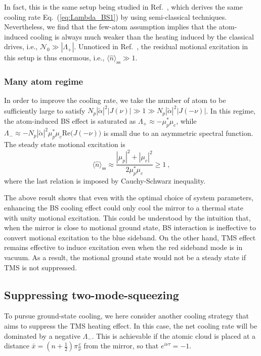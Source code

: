 \documentclass[aps, pra, reprint, amsmath, amssymb, groupedaddress, acknowledgments]{revtex4-1}
\begin{document}
In fact, this is the same setup being studied in Ref.~\cite{2016PhRvA..93b3816S}, which derives the same cooling rate Eq.~(\ref{eq:Lambda_BS1}) by using semi-classical techniques.  Nevertheless, we find that the few-atom assumption implies that the atom-induced cooling is always much weaker than the heating induced by the classical drives, i.e., $\mathcal{N}_0 \gg |\Lambda_+|$.  Unnoticed in Ref.~\cite{2016PhRvA..93b3816S}, the residual motional excitation in this setup is thus enormous, i.e., $\langle \hat{n} \rangle_\textrm{ss} \gg 1$.

\subsubsection{Many atom regime}

In order to improve the cooling rate, we take the number of atom to be sufficiently large to satisfy $N_p |\tilde{\alpha}|^2 |J(\nu)| \gg 1 \gg N_p |\tilde{\alpha}|^2 |J(-\nu)|$.  In this regime, the atom-induced BS effect is saturated as $\Lambda_+ \approx -\mu_p^\ast \mu_c$, while $\Lambda_-\approx -N_p |\tilde{\alpha}|^2 \mu_p^\ast \mu_c \textrm{Re}\big(J(-\nu)\big)$ is small due to an asymmetric  spectral function.  The steady state motional excitation is
\begin{equation}\label{eq:nf_BS}
\langle \hat{n} \rangle_\textrm{ss} \approx \frac{|\mu_p|^2+|\mu_c|^2}{2 \mu_p^\ast \mu_c} \geq 1~,
\end{equation}
where the last relation is imposed by Cauchy-Schwarz inequality.

The above result shows that even with the optimal choice of system parameters, enhancing the BS cooling effect could only cool the mirror to a thermal state with unity motional excitation.  This could be understood by the intuition that, when the mirror is close to motional ground state, BS interaction is ineffective to convert motional excitation to the blue sideband.  On the other hand, TMS effect remains effective to induce excitation even when the red sideband mode is in vacuum.  As a result, the motional ground state would not be a steady state if TMS is not suppressed.

\subsection{Suppressing two-mode-squeezing}

To pursue ground-state cooling, we here consider another cooling strategy that aims to suppress the TMS heating effect.  In this case, the net cooling rate will be dominated by a negative $\Lambda_-$.  This is achievable if the atomic cloud is placed at a distance $\bar{x}=(n+\frac{1}{2})\pi\frac{c}{\nu}$ from the mirror, so that $e^{i\nu\tau}=-1$.  
\end{document}
